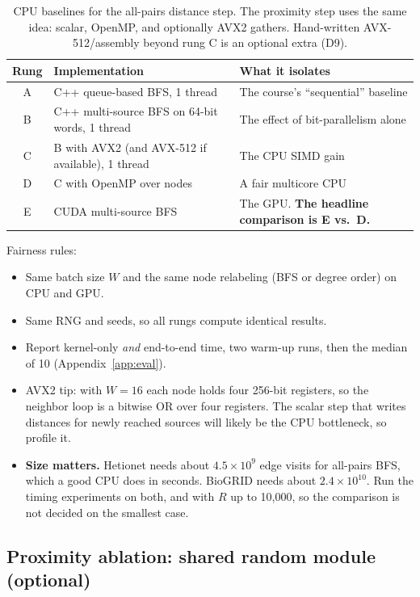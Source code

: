 \begin{table}[!ht]
\centering
\small
\begin{tabularx}{\linewidth}{@{}c>{\raggedright\arraybackslash}p{4.3cm}>{\raggedright\arraybackslash}X@{}}
\toprule
Rung & Implementation & What it isolates \\
\midrule
A & C++ queue-based BFS, 1 thread & The course's ``sequential'' baseline \\
B & C++ multi-source BFS on 64-bit words, 1 thread & The effect of bit-parallelism alone \\
C & B with AVX2 (and AVX-512 if available), 1 thread & The CPU SIMD gain \\
D & C with OpenMP over nodes & A fair multicore CPU \\
E & CUDA multi-source BFS & The GPU. \textbf{The headline comparison is E vs.\ D.} \\
\bottomrule
\end{tabularx}
\caption{CPU baselines for the all-pairs distance step. The proximity step
uses the same idea: scalar, OpenMP, and optionally AVX2 gathers. Hand-written
AVX-512/assembly beyond rung C is an optional extra (D9).}
\end{table}

Fairness rules:
\begin{itemize}[nosep]
  \item Same batch size $W$ and the same node relabeling (BFS or degree
        order) on CPU and GPU.
  \item Same RNG and seeds, so all rungs compute identical results.
  \item Report kernel-only \emph{and} end-to-end time, two warm-up runs, then
        the median of 10 (Appendix~\ref{app:eval}).
  \item AVX2 tip: with $W=16$ each node holds four 256-bit registers, so the
        neighbor loop is a bitwise OR over four registers. The scalar
        step that writes distances for newly reached sources will likely be
        the CPU bottleneck, so profile it.
  \item \textbf{Size matters.} Hetionet needs about $4.5\times10^{9}$ edge
        visits for all-pairs BFS, which a good CPU does in seconds. BioGRID
        needs about $2.4\times10^{10}$. Run the timing experiments on both, and
        with $R$ up to 10{,}000, so the comparison is not decided on the
        smallest case.
\end{itemize}

\subsection{Proximity ablation: shared random module (optional)}
\label{sec:ablation}

